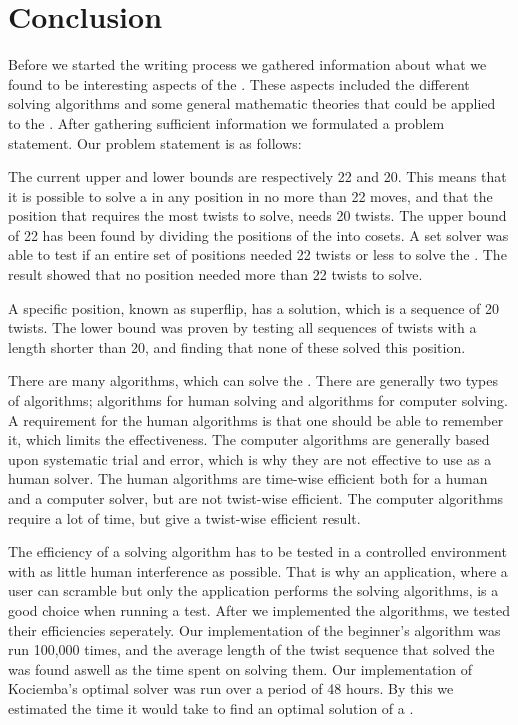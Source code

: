 \chapter{Conclusion}
Before we started the writing process we gathered information about what we found to be interesting aspects of the \rubik{}. 
These aspects included the different solving algorithms and some general mathematic theories that could be applied to the \rubik{}.
After gathering sufficient information we formulated a problem statement. Our problem statement is as follows:


\linebreak

The current upper and lower bounds are respectively 22 and 20. 
This means that it is possible to solve a \rubik{} in any position in no more than 22 moves, and that the \rubik{} position that requires the most twists to solve, needs 20 twists.
The upper bound of 22 has been found by dividing the positions of the \rubik{} into cosets. A set solver was able to test if an entire set of positions needed 22 twists or less to solve the \rubik{}. The result showed that no \rubik{} position needed more than 22 twists to solve.

A specific \rubik{} position, known as superflip, has a solution, which is a sequence of 20 twists.
The lower bound was proven by testing all sequences of twists with a length shorter than 20, and finding that none of these solved this position.

There are many algorithms, which can solve the \rubik{}. 
There are generally two types of algorithms; algorithms for human solving and algorithms for computer solving. 
A requirement for the human algorithms is that one should be able to remember it, which limits the effectiveness. 
The computer algorithms are generally based upon systematic trial and error, which is why they are not effective to use as a human solver.
The human algorithms are time-wise efficient both for a human and a computer solver, but are not twist-wise efficient.
The computer algorithms require a lot of time, but give a twist-wise efficient result.

The efficiency of a solving algorithm has to be tested in a controlled environment with as little human interference as possible. 
That is why an application, where a user can scramble but only the application performs the solving algorithms, is a good choice when running a test.
After we implemented the algorithms, we tested their efficiencies seperately.
Our implementation of the beginner's algorithm was run 100,000 times, and the average length of the twist sequence that solved the \rubik{} was found aswell as the time spent on solving them. 
Our implementation of Kociemba's optimal solver was run over a period of 48 hours. By this we estimated the time it would take to find an optimal solution of a \rubik{}.